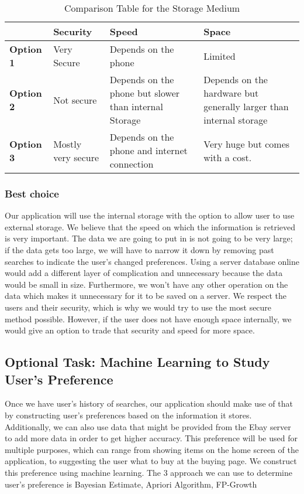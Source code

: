 \documentclass[journal,compsoc, 10pt, draftclsnofoot, onecolumn]{IEEEtran}
\begin{document}
\begin{table}[h]
	\centering
	\caption{Comparison Table for the Storage Medium}
	\label{Comparison Table for the Storage Medium}
	\begin{tabularx}{\textwidth}{|X|X|X|X|}
		\hline
		\textbf{}         & \textbf{Security}                & \textbf{Speed} &\textbf{Space}
		\\ \hline
		\textbf{Option 1} & Very Secure & Depends on the phone & Limited
		\\ \hline
		\textbf{Option 2} & Not secure & Depends on the phone but slower than internal Storage & Depends on the hardware but generally larger than internal storage                                                                                         
		\\ \hline
		\textbf{Option 3} & Mostly very secure &Depends on the phone and internet connection & Very huge but comes with a cost.                                                               
		\\ \hline
	\end{tabularx}
\end{table}

\subsubsection{Best choice}
Our application will use the internal storage with the option to allow user to use external storage. We believe that the speed on which the information is retrieved is very important. The data we are going to put in is not going to be very large; if the data gets too large, we will have to narrow it down by removing past searches to indicate the user's changed preferences. Using a server database online would add a different layer of complication and unnecessary because the data would be small in size. Furthermore, we won't have any other operation on the data which makes it unnecessary for it to be saved on a server. We respect the users and their security, which is why we would try to use the most secure method possible. However, if the user does not have enough space internally, we would give an option to trade that security and speed for more space.

\subsection{Optional Task: Machine Learning to Study User's Preference}
Once we have user's history of searches, our application should make use of that by constructing user's preferences based on the information it stores. Additionally, we can also use data that might be provided from the Ebay server to add more data in order to get higher accuracy. This preference will be used for multiple purposes, which can range from showing items on the home screen of the application, to suggesting the user what to buy at the buying page. We construct this preference using machine learning.
The 3 approach we can use to determine user's preference is Bayesian Estimate, Apriori Algorithm, FP-Growth
\end{document}
